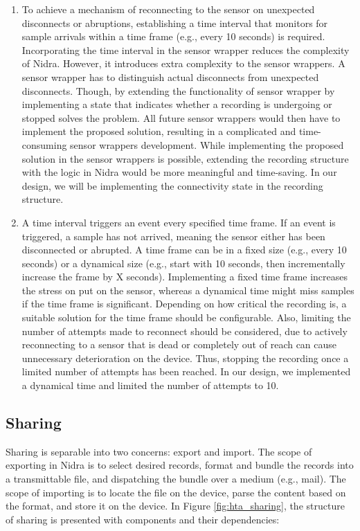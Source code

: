 \begin{enumerate}
    \item To achieve a mechanism of reconnecting to the sensor on unexpected disconnects or abruptions, establishing a time interval that monitors for sample arrivals within a time frame (e.g., every 10 seconds) is required. Incorporating the time interval in the sensor wrapper reduces the complexity of Nidra. However, it introduces extra complexity to the sensor wrappers. A sensor wrapper has to distinguish actual disconnects from unexpected disconnects. Though, by extending the functionality of sensor wrapper by implementing a state that indicates whether a recording is undergoing or stopped solves the problem. All future sensor wrappers would then have to implement the proposed solution, resulting in a complicated and time-consuming sensor wrappers development. While implementing the proposed solution in the sensor wrappers is possible, extending the recording structure with the logic in Nidra would be more meaningful and time-saving. In our design, we will be implementing the connectivity state in the recording structure.
    \item A time interval triggers an event every specified time frame. If an event is triggered, a sample has not arrived, meaning the sensor either has been disconnected or abrupted. A time frame can be in a fixed size (e.g., every 10 seconds) or a dynamical size (e.g., start with 10 seconds, then incrementally increase the frame by X seconds). Implementing a fixed time frame increases the stress on put on the sensor, whereas a dynamical time might miss samples if the time frame is significant. Depending on how critical the recording is, a suitable solution for the time frame should be configurable. Also, limiting the number of attempts made to reconnect should be considered, due to actively reconnecting to a sensor that is dead or completely out of reach can cause unnecessary deterioration on the device. Thus, stopping the recording once a limited number of attempts has been reached.  In our design, we implemented a dynamical time and limited the number of attempts to 10. 
\end{enumerate}

\subsection{Sharing}

Sharing is separable into two concerns: export and import. The scope of exporting in Nidra is to select desired records, format and bundle the records into a transmittable file, and dispatching the bundle over a medium (e.g., mail). The scope of importing is to locate the file on the device, parse the content based on the format, and store it on the device. In Figure \ref{fig:hta_sharing}, the structure of sharing is presented with components and their dependencies: 

